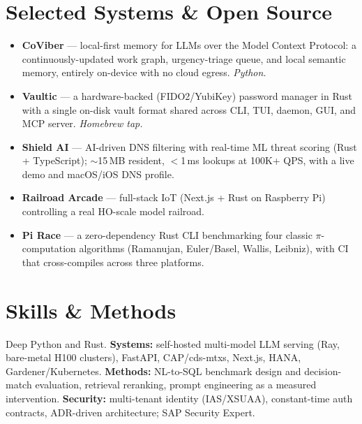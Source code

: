 \documentclass[11pt,letterpaper]{article}
\begin{document}
\section{Selected Systems \& Open Source}
\begin{itemize}
  \item \textbf{CoViber} --- local-first memory for LLMs over the Model Context Protocol: a
  continuously-updated work graph, urgency-triage queue, and local semantic memory, entirely on-device
  with no cloud egress. \textit{Python.}
  \item \textbf{Vaultic} --- a hardware-backed (FIDO2/YubiKey) password manager in Rust with a single
  on-disk vault format shared across CLI, TUI, daemon, GUI, and MCP server. \textit{Homebrew tap.}
  \item \textbf{Shield AI} --- AI-driven DNS filtering with real-time ML threat scoring (Rust +
  TypeScript); $\sim$15\,MB resident, $<$1\,ms lookups at 100K+ QPS, with a live demo and macOS/iOS DNS profile.
  \item \textbf{Railroad Arcade} --- full-stack IoT (Next.js + Rust on Raspberry Pi) controlling a real
  HO-scale model railroad.
  \item \textbf{Pi Race} --- a zero-dependency Rust CLI benchmarking four classic $\pi$-computation
  algorithms (Ramanujan, Euler/Basel, Wallis, Leibniz), with CI that cross-compiles across three platforms.
\end{itemize}

\section{Skills \& Methods}
Deep Python and Rust. \textbf{Systems:} self-hosted multi-model LLM serving (Ray, bare-metal H100
clusters), FastAPI, CAP/cds-mtxs, Next.js, HANA, Gardener/Kubernetes. \textbf{Methods:} NL-to-SQL
benchmark design and decision-match evaluation, retrieval reranking, prompt engineering as a measured
intervention. \textbf{Security:} multi-tenant identity (IAS/XSUAA), constant-time auth contracts,
ADR-driven architecture; SAP Security Expert.

\end{document}
